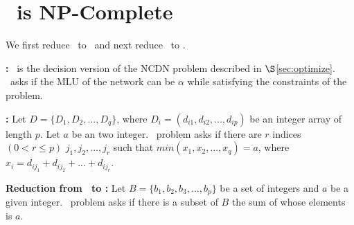 






\eat
{


\section{\optloc\ is NP-Complete}
\label{sec:npcreduction}



We first reduce \subsetsum\ to \minsubsetsum\ and next reduce \minsubsetsum\ to \optloc. 


\vsp
{\bf{\optloc:}}  \optloc\ is the decision version of the NCDN problem described in $\S$\ref{sec:optimize}.  \optloc\ asks if the MLU of the network can be $\alpha$ while satisfying the constraints of the problem.





\vsp

\textbf{\minsubsetsum:} Let $D = \{D_1, D_2, ..., D_q\}$, where $D_i = (d_{i1}, d_{i2}, ..., d_{ip})$ be an  integer array of length $p$. Let $a$ be an two integer. \minsubsetsum\ problem asks if there are $r$ indices $(0 < r \leq p)$ $j_1, j_2, ..., j_r$ such that $ \textit{min}(x_1, x_2, ... , x_q) = a$, where $x_i = d_{ij_1} + d_{ij_2} + ... + d_{ij_r}$.

\vsp
\textbf{Reduction from \subsetsum\ to \minsubsetsum:} 
Let $B = \{ b_1, b_2, b_3, ..., b_p\}$ be a set of integers and $a$ be a given integer. \subsetsum\ problem asks if there is a subset of $B$ the sum of whose elements is $a$. 

}
